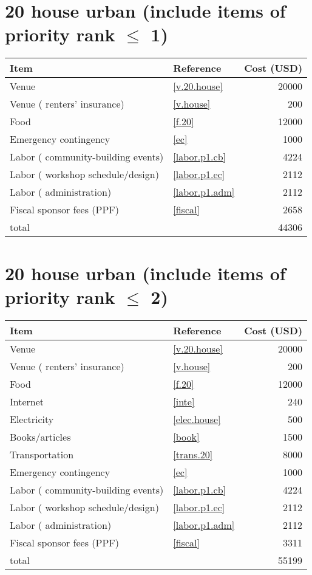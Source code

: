 \section*{20 house urban (include items of priority rank $\leq$ 1)}
\begin{center}
\begin{tabular}{llr}
Item & Reference & Cost (USD) \\ \hline
Venue & \ref{v.20.house} & 20000 \\
Venue ( renters' insurance) & \ref{v.house} & 200 \\
Food & \ref{f.20} & 12000 \\
Emergency contingency & \ref{ec} & 1000 \\
Labor ( community-building events) & \ref{labor.p1.cb} & 4224 \\
Labor ( workshop schedule/design) & \ref{labor.p1.ec} & 2112 \\
Labor ( administration) & \ref{labor.p1.adm} & 2112 \\
Fiscal sponsor fees (PPF) & \ref{fiscal} & 2658 \\ \hline
total &  & 44306
\end{tabular}
\end{center}
\newpage
\section*{20 house urban (include items of priority rank $\leq$ 2)}
\begin{center}
\begin{tabular}{llr}
Item & Reference & Cost (USD) \\ \hline
Venue & \ref{v.20.house} & 20000 \\
Venue ( renters' insurance) & \ref{v.house} & 200 \\
Food & \ref{f.20} & 12000 \\
Internet & \ref{inte} & 240 \\
Electricity & \ref{elec.house} & 500 \\
Books/articles & \ref{book} & 1500 \\
Transportation & \ref{trans.20} & 8000 \\
Emergency contingency & \ref{ec} & 1000 \\
Labor ( community-building events) & \ref{labor.p1.cb} & 4224 \\
Labor ( workshop schedule/design) & \ref{labor.p1.ec} & 2112 \\
Labor ( administration) & \ref{labor.p1.adm} & 2112 \\
Fiscal sponsor fees (PPF) & \ref{fiscal} & 3311 \\ \hline
total &  & 55199
\end{tabular}
\end{center}
\newpage
